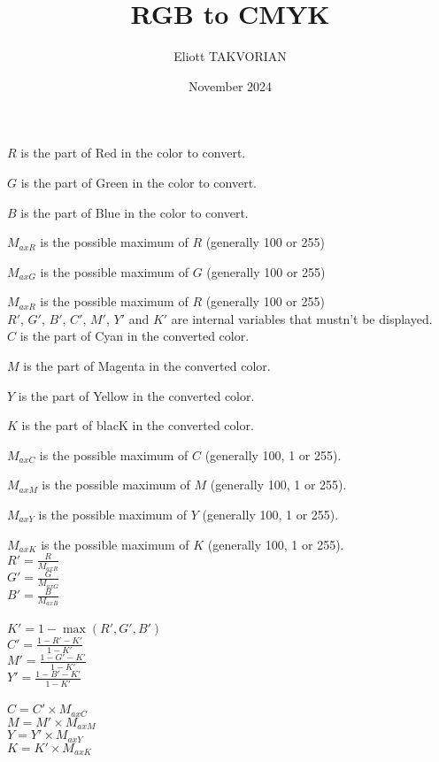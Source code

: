 \documentclass{article}
\title{RGB to CMYK}
\author{Eliott TAKVORIAN}
\date{November 2024}
\begin{document}
    $R$ is the part of Red in the color to convert.

    $G$ is the part of Green in the color to convert.

    $B$ is the part of Blue in the color to convert.

    $M_{axR}$ is the possible maximum of $R$ (generally 100 or 255)

    $M_{axG}$ is the possible maximum of $G$ (generally 100 or 255)

    $M_{axR}$ is the possible maximum of $R$ (generally 100 or 255)\\

    $R'$, $G'$, $B'$, $C'$, $M'$, $Y'$ and $K'$ are internal variables that mustn't be displayed.\\

    $C$ is the part of Cyan in the converted color.

    $M$ is the part of Magenta in the converted color.

    $Y$ is the part of Yellow in the converted color.

    $K$ is the part of blacK in the converted color.

    $M_{axC}$ is the possible maximum of $C$ (generally 100, 1 or 255).

    $M_{axM}$ is the possible maximum of $M$ (generally 100, 1 or 255).

    $M_{axY}$ is the possible maximum of $Y$ (generally 100, 1 or 255).

    $M_{axK}$ is the possible maximum of $K$ (generally 100, 1 or 255).\\

    $R'=\frac{R}{M_{axR}}$\\

    $G'=\frac{G}{M_{axG}}$\\

    $B'=\frac{B}{M_{axB}}$\\\\

    $K'=1-\max(R', G', B')$\\

    $C'=\frac{1-R'-K'}{1-K'}$\\

    $M'=\frac{1-G'-K'}{1-K'}$\\

    $Y'=\frac{1-B'-K'}{1-K'}$\\\\

    $C=C'\times M_{axC}$\\

    $M=M'\times M_{axM}$\\

    $Y=Y'\times M_{axY}$\\

    $K=K'\times M_{axK}$\\

    
\end{document}
